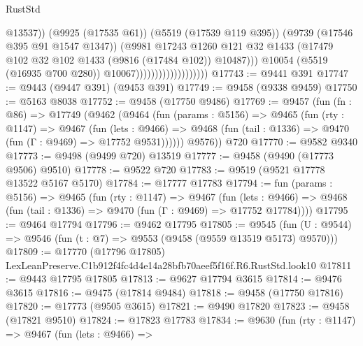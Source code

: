 \begin{lexlean}{RustStd}
\begin{coremodule}
                                                @13537))
                                            (@9925 (@17535 @61))
                                            (@5519 (@17539 @119 @395))
                                            (@9739 (@17546 @395 @91 @1547 @1347))
                                            (@9981
                                              @17243
                                              @1260
                                              @121
                                              @32
                                              @1433
                                              (@17479
                                                @102
                                                @32
                                                @102
                                                @1433
                                                (@9816 (@17484 @102))
                                                @10487)))
                                          @10054
                                          (@5519 (@16935 @700 @280))
                                          @10067)))))))))))))))))))
@17743 := @9441 @391
@17747 := @9443 (@9447 @391) (@9453 @391)
@17749 := @9458 (@9338 @9459)
@17750 := @5163 @8038
@17752 := @9458 (@17750 @9486)
@17769 := @9457
    (fun (fn : @86) =>
    @17749
      (@9462
        (@9464
          (fun (params : @5156) =>
          @9465
            (fun (rty : @1147) =>
            @9467
              (fun (lets : @9466) =>
              @9468 (fun (tail : @1336) => @9470 (fun (Γ : @9469) => @17752 @9531))))))
        @9576))
    @720
@17770 := @9582 @9340
@17773 := @9498 (@9499 @720) @13519
@17777 := @9458 (@9490 (@17773 @9506) @9510)
@17778 := @9522 @720
@17783 := @9519 (@9521 @17778 @13522 @5167 @5170)
@17784 := @17777 @17783
@17794 := fun (params : @5156) =>
  @9465
    (fun (rty : @1147) =>
    @9467
      (fun (lets : @9466) =>
      @9468 (fun (tail : @1336) => @9470 (fun (Γ : @9469) => @17752 @17784))))
@17795 := @9464 @17794
@17796 := @9462 @17795
@17805 := @9545
    (fun (U : @9544) => @9546 (fun (t : @7) => @9553 (@9458 (@9559 @13519 @5173) @9570)))
@17809 := @17770 (@17796 @17805) LexLeanPreserve.C1b912f4fc4d4e14a28bfb70aeef5f16f.R6.RustStd.look10
@17811 := @9443 @17795 @17805
@17813 := @9627 @17794 @3615
@17814 := @9476 @3615
@17816 := @9475 (@17814 @9484)
@17818 := @9458 (@17750 @17816)
@17820 := @17773 (@9505 @3615)
@17821 := @9490 @17820
@17823 := @9458 (@17821 @9510)
@17824 := @17823 @17783
@17834 := @9630
    (fun (rty : @1147) =>
    @9467
      (fun (lets : @9466) =>

\end{coremodule}
\end{lexlean}
